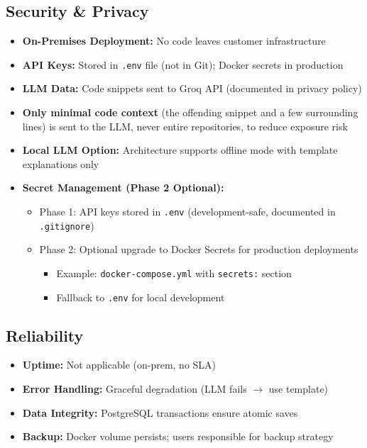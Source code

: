 \documentclass[11pt,a4paper]{article}
\begin{document}
\subsection{Security \& Privacy}
\begin{itemize}[leftmargin=*]
    \item \textbf{On-Premises Deployment:} No code leaves customer infrastructure
    \item \textbf{API Keys:} Stored in \texttt{.env} file (not in Git); Docker secrets in production
    \item \textbf{LLM Data:} Code snippets sent to Groq API (documented in privacy policy)
    \item \textbf{Only minimal code context} (the offending snippet and a few surrounding lines) is sent to the LLM, never entire repositories, to reduce exposure risk
    \item \textbf{Local LLM Option:} Architecture supports offline mode with template explanations only
    \item \textbf{Secret Management (Phase 2 Optional):}
    \begin{itemize}
        \item Phase 1: API keys stored in \texttt{.env} (development-safe, documented in \texttt{.gitignore})
        \item Phase 2: Optional upgrade to Docker Secrets for production deployments
        \begin{itemize}
            \item Example: \texttt{docker-compose.yml} with \texttt{secrets:} section
            \item Fallback to \texttt{.env} for local development
        \end{itemize}
    \end{itemize}
\end{itemize}

\subsection{Reliability}
\begin{itemize}[leftmargin=*]
    \item \textbf{Uptime:} Not applicable (on-prem, no SLA)
    \item \textbf{Error Handling:} Graceful degradation (LLM fails $\rightarrow$ use template)
    \item \textbf{Data Integrity:} PostgreSQL transactions ensure atomic saves
    \item \textbf{Backup:} Docker volume persists; users responsible for backup strategy
\end{itemize}
\end{document}
